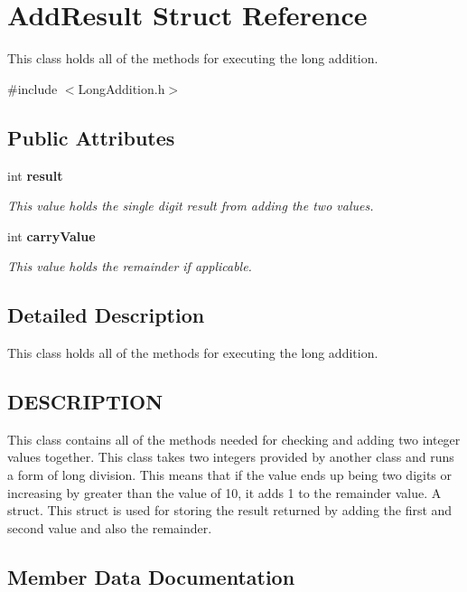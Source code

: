 \section{Add\+Result Struct Reference}
\label{struct_add_result}


This class holds all of the methods for executing the long addition.  




{\ttfamily \#include $<$Long\+Addition.\+h$>$}

\subsection*{Public Attributes}
\begin{DoxyCompactItemize}
\item 
int \textbf{ result}
\begin{DoxyCompactList}\small\item\em This value holds the single digit result from adding the two values. \end{DoxyCompactList}\item 
int \textbf{ carry\+Value}
\begin{DoxyCompactList}\small\item\em This value holds the remainder if applicable. \end{DoxyCompactList}\end{DoxyCompactItemize}


\subsection{Detailed Description}
This class holds all of the methods for executing the long addition. 

\subsection{D\+E\+S\+C\+R\+I\+P\+T\+I\+ON}\label{namespacestd_DESCRIPTION}
This class contains all of the methods needed for checking and adding two integer values together. This class takes two integers provided by another class and runs a form of long division. This means that if the value ends up being two digits or increasing by greater than the value of 10, it adds 1 to the remainder value. A struct. This struct is used for storing the result returned by adding the first and second value and also the remainder. 

\subsection{Member Data Documentation}
\mbox{\label{struct_add_result_a06d99d9daaebd0528d158e86441fd189}} 
